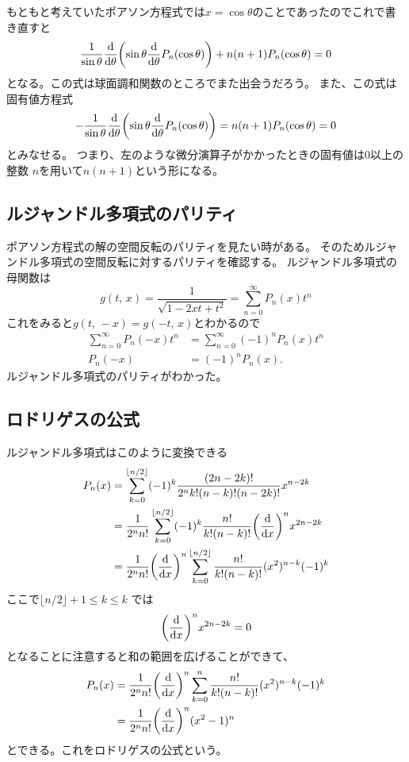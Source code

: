 \documentclass[../master.tex]{subfiles}
\begin{document}
もともと考えていたポアソン方程式では\(x=\cos\theta\)のことであったのでこれで書き直すと
\begin{equation}
	\frac{1}{\sin\theta}\dv{\theta}\qty(\sin\theta\dv{\theta}P_n(\cos\theta)) + n(n+1)P_n(\cos\theta) =0 \label{eq:legendre_dif_eq2}
\end{equation}
となる。この式は球面調和関数のところでまた出会うだろう。
また、この式は固有値方程式
\begin{equation}
	-\frac{1}{\sin\theta}\dv{\theta}\qty(\sin\theta\dv{\theta}P_n(\cos\theta)) = n(n+1)P_n(\cos\theta) =0
\end{equation}
とみなせる。
つまり、左のような微分演算子がかかったときの固有値は0以上の整数
\(n\)を用いて\(n(n+1)\)という形になる。

\subsection{ルジャンドル多項式のパリティ}
ポアソン方程式の解の空間反転のパリティを見たい時がある。
そのためルジャンドル多項式の空間反転に対するパリティを確認する。
ルジャンドル多項式の母関数は
\begin{equation}
	g(t,\,x) = \frac{1}{\sqrt{1-2xt + t^2}} = \sum_{n=0}^{\infty}P_n(x)t^n
\end{equation}
これをみると\(g(t,\,-x)=g(-t,\,x)\)とわかるので
\begin{align}
	\sum_{n=0}^{\infty} P_n(-x)t^n & = \sum_{n=0}^{\infty} (-1)^n P_n(x)t^n \\
	P_n(-x)                        & = (-1)^n P_n(x).
\end{align}
ルジャンドル多項式のパリティがわかった。

\subsection{ロドリゲスの公式}
ルジャンドル多項式はこのように変換できる
\begin{equation}\begin{aligned}[b]
    P_n(x) & = \sum_{k=0}^{\lfloor n/2 \rfloor}(-1)^k \frac{(2n-2k)!}{2^n k!(n-k)!(n-2k)!}x^{n-2k}                \\
	       & =\frac{1}{2^n n!}\sum_{k=0}^{\lfloor n/2 \rfloor}(-1)^k \frac{n!}{k!(n-k)!}\qty(\dv{x})^nx^{2n-2k}   \\
	       & =\frac{1}{2^n n!}\qty(\dv{x})^n\sum_{k=0}^{\lfloor n/2 \rfloor} \frac{n!}{k!(n-k)!}(x^2)^{n-k}(-1)^k
\end{aligned}\end{equation}
ここで\(\lfloor n/2 \rfloor + 1 \leq k \leq k\) では
\begin{equation}
	\qty(\dv{x})^n x^{2n-2k} =0
\end{equation}
となることに注意すると和の範囲を広げることができて、
\begin{equation}\begin{aligned}[b]
    P_n(x) & = \frac{1}{2^n n!}\qty(\dv{x})^n\sum_{k=0}^{n} \frac{n!}{k!(n-k)!}(x^2)^{n-k}(-1)^k \\
	       & = \frac{1}{2^n n!}\qty(\dv{x})^n(x^2-1)^n
\end{aligned}\end{equation}
とできる。これをロドリゲスの公式という。
\end{document}
